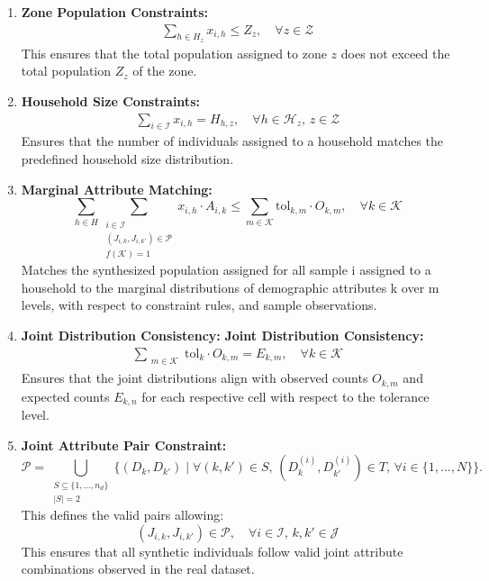 \begin{enumerate}[label=\textbf{C\arabic*}, ref=C\arabic*]

    \item \textbf{Zone Population Constraints:}
    \begin{align}
        \sum_{h \in H_z} x_{i,h} \leq Z_z, \quad \forall z \in \mathcal{Z}
        \label{eq:zone_population}
    \end{align}  
    This ensures that the total population assigned to zone \( z \) does not exceed the total population \( Z_z \) of the zone.

    \item \textbf{Household Size Constraints:}
    \begin{align}
        \sum_{i \in \mathcal{I}} x_{i,h} = H_{h,z}, \quad \forall h \in \mathcal{H}_z, \, z \in \mathcal{Z}
        \label{eq:household_size}
    \end{align}
    Ensures that the number of individuals assigned to a household matches the predefined household size distribution.

  \item  \textbf{Marginal Attribute Matching:}
\begin{equation}
\sum_{h \in H} \sum_{\substack{i \in \mathcal{I} \\ (J_{i,k}, J_{i, k'}) \in \mathcal{P} \\ f(\mathcal{K}) =1 }} x_{i,h} \cdot A_{i,k} \leq \sum_{m \in \mathcal{K}} \text{tol}_{k,m} \cdot O_{k,m}, \quad \forall k \in \mathcal{K}
\label{eq:marginal_matching}
\end{equation}
    Matches the synthesized population assigned for all sample i assigned to a household to the marginal distributions of demographic attributes k over m levels, with respect to constraint rules, and sample observations.

    \item \textbf{Joint Distribution Consistency:}
\textbf{Joint Distribution Consistency:}
\begin{align}
\sum_{\substack{m \in \mathcal{K} }} \text{tol}_k \cdot O_{k,m} = E_{k,m}, \quad \forall k \in \mathcal{K}
        \label{eq:joint_distribution}
    \end{align}
    Ensures that the joint distributions align with observed counts \( O_{k,m} \) and expected counts \( E_{k,n} \) for each respective cell with respect to the tolerance level.

    \item \textbf{Joint Attribute Pair Constraint:}
\[
\mathcal{P} = \bigcup_{\substack{S \subseteq \{1, \dots, n_d\} \\ |S| = 2}} \{(D_k, D_{k'}) \mid \forall (k, k') \in S, \, (D_k^{(i)}, D_{k'}^{(i)}) \in T, \, \forall i \in \{1, \dots, N\}\}.
\]
This defines the valid pairs allowing:
    \[
    (J_{i,k} ,J_{i,k'}) \in \mathcal{P}, \quad \forall i \in \mathcal{I}, \, k, k' \in \mathcal{J}
    \label{eq:jatt}
    \]
    This ensures that all synthetic individuals follow valid joint attribute combinations observed in the real dataset.



\end{enumerate}
